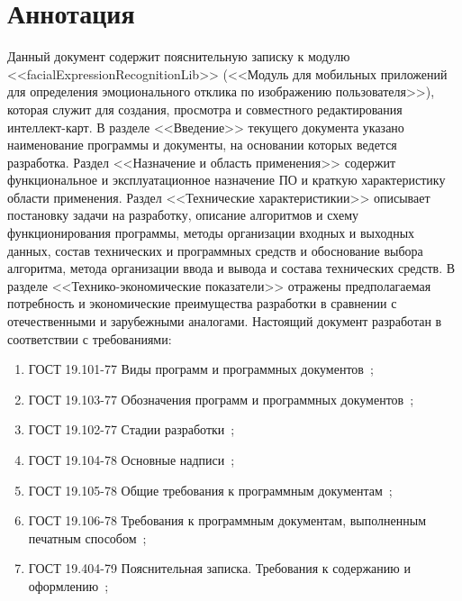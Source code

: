 \documentclass[a4paper,12pt]{article}
\begin{document}
    \firstPage
    \newpage
    \annotation
    \section*{Аннотация}
    Данный документ содержит пояснительную записку к модулю <<facialExpressionRecognitionLib>> (<<Модуль для мобильных приложений для определения эмоционального отклика по изображению пользователя>>), которая служит для создания, просмотра и совместного редактирования интеллект-карт. В разделе <<Введение>> текущего документа указано наименование программы и документы, на основании которых ведется разработка. Раздел <<Назначение и область применения>> содержит функциональное и эксплуатационное назначение ПО и краткую характеристику области применения. Раздел <<Технические характеристикии>> описывает постановку задачи на разработку, описание алгоритмов и схему функционирования программы, методы организации входных и выходных данных, состав технических и программных средств и обоснование выбора алгоритма, метода организации ввода и вывода и состава технических средств. В разделе <<Технико-экономические показатели>> отражены предполагаемая потребность и экономические преимущества разработки в сравнении с отечественными и зарубежными аналогами.
    Настоящий документ разработан в соответствии с требованиями:
    \begin{enumerate}
        \item ГОСТ 19.101-77 Виды программ и программных документов~\cite{gost1};
        \item ГОСТ 19.103-77 Обозначения программ и программных документов~\cite{gost2};
        \item ГОСТ 19.102-77 Стадии разработки~\cite{gost3};
        \item ГОСТ 19.104-78 Основные надписи~\cite{gost4};
        \item ГОСТ 19.105-78 Общие требования к программным документам~\cite{gost5};
        \item ГОСТ 19.106-78 Требования к программным документам, выполненным печатным способом~\cite{gost6};
        \item ГОСТ 19.404-79 Пояснительная записка. Требования к содержанию и оформлению~\cite{gost7};
    \end{enumerate}
    \newpage
    \thirdPage
    \newpage
\end{document}
